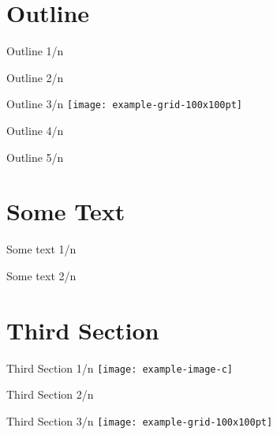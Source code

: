 \section{Outline}
\begin{frame}{Outline 1/n}
\blinditemize    
\end{frame}

\begin{frame}{Outline 2/n}
\blinditemize    
\end{frame}

\begin{frame}{Outline 3/n}
\centering
\texttt{[image: example-grid-100x100pt]}
\end{frame}

\begin{frame}{Outline 4/n}
\blindenumerate
\end{frame}

\begin{frame}{Outline 5/n}
\blinddescription
\end{frame}

\section{Some Text}
\begin{frame}{Some text 1/n}
\blindtext    
\end{frame}

\begin{frame}{Some text 2/n}
\blindtext    
\end{frame}

\section{Third Section}
\begin{frame}{Third Section 1/n}
\centering
\noindent\texttt{[image: example-image-c]}  
\end{frame}    

\begin{frame}{Third Section 2/n}
\blindenumerate    
\end{frame}    

\begin{frame}{Third Section 3/n}
\centering
\texttt{[image: example-grid-100x100pt]}   
\end{frame}    

